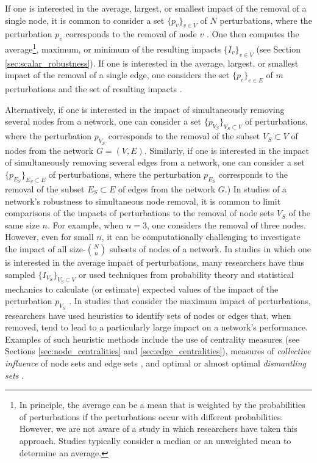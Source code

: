 \documentclass{comnet-mod}
\begin{document}
If one is interested in the average, largest, or smallest impact of the removal of a single node, it is common to consider a set $\{p_v\}_{v\in V}$ of $N$ perturbations, where the perturbation $p_v$ corresponds to the removal of node $v$ \cite{Wilhelm2004, Wang2014, Tang2016}. One then computes the average\footnote{In principle, the average can be a mean that is weighted by the probabilities of perturbations if the perturbations occur with different probabilities. However, we are not aware of a study in which researchers have taken this approach. Studies typically consider a median or an unweighted mean to determine an average.}, maximum, or minimum of the resulting impacts $\{I_v\}_{v\in V}$ (see Section \ref{sec:scalar_robustness}). 
If one is interested in the average, largest, or smallest impact of the removal of a single edge, one considers the set $\{p_e\}_{e\in E}$ of $m$ perturbations and the set of resulting impacts \cite{Latora2005}.

Alternatively, if one is interested in the impact of simultaneously removing several nodes from a network, one can consider a set $\{p_{V_S}\}_{{V_S}\subset V}$ of perturbations, where the perturbation $p_{V_S}$ corresponds to the removal of the subset $V_S \subset V$ of nodes from the network $G=(V,E)$. Similarly, if one is interested in the impact of simultaneously removing several edges from a network, one can consider a set $\{p_{E_S}\}_{{E_S}\subset E}$ of perturbations, where the perturbation $p_{E_S}$ corresponds to the removal of the subset $E_S\subset E$ of edges from the network $G$.) In studies of a network's robustness to simultaneous node removal, it is common to limit comparisons of the impacts of perturbations to the removal of node sets $V_S$ of the same size $n$. For example, when $n = 3$, one considers the removal of three nodes. However, even for small $n$, it can be computationally challenging to investigate the impact of all size-$\binom{N}{n}$ subsets of nodes of a network. In studies in which one is interested in the average impact of perturbations, many researchers have thus sampled $\{I_{V_S}\}_{V_S\subset V}$ \cite{Tang2016} or used techniques from probability theory and statistical mechanics to calculate (or estimate) expected values of the impact of the perturbation $p_{V_S}$ \cite{Cohen2000, Boguna2005, Cohen2010}. 
In studies that consider the maximum impact of perturbations, researchers have used heuristics to identify sets of nodes or edges that, when removed, tend to lead to a particularly large impact on a network's performance. Examples of such heuristic methods include the use of centrality measures (see Sections \ref{sec:node_centralities} and \ref{sec:edge_centralities}), measures of \textit{collective influence} of node sets and edge sets \cite{Morone2015, Lue2016, Morone2016, Pei2019}, and optimal or almost optimal \textit{dismantling sets} \cite{Morone2015, Braunstein2016, daCunha2017, deAbreu2018}. 
\end{document}
